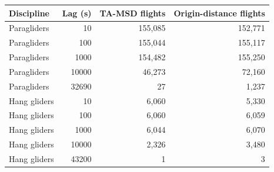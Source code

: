 \begin{tabular}{lrrr}
\toprule
Discipline & Lag (s) & TA-MSD flights & Origin-distance flights\\
\midrule
Paragliders & 10 & 155,085 & 152,771\\
Paragliders & 100 & 155,044 & 155,117\\
Paragliders & 1000 & 154,482 & 155,250\\
Paragliders & 10000 & 46,273 & 72,160\\
Paragliders & 32690 & 27 & 1,237\\
Hang gliders & 10 & 6,060 & 5,330\\
Hang gliders & 100 & 6,060 & 6,059\\
Hang gliders & 1000 & 6,044 & 6,070\\
Hang gliders & 10000 & 2,326 & 3,480\\
Hang gliders & 43200 & 1 & 3\\
\bottomrule
\end{tabular}

